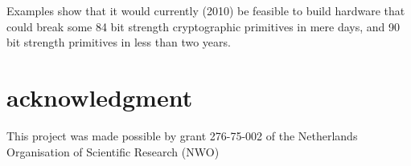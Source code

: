 \documentclass{article}
\begin{document}
Examples show
that it would currently (2010) be feasible to build hardware that could break 
some 84 bit strength cryptographic primitives in mere days, and 90 bit 
strength primitives in less than two years.

\section{acknowledgment}
This project was made possible by grant 276-75-002 of the Netherlands
Organisation of Scientific Research (NWO)




\end{document}
